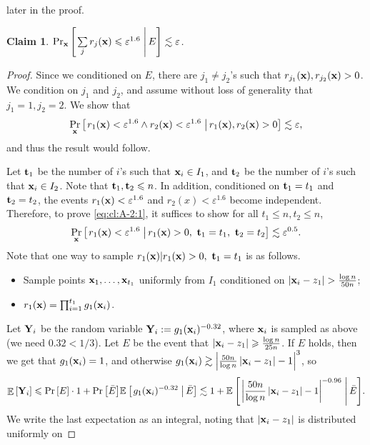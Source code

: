 \documentclass[10pt,a4paper]{article}
\newtheorem{claim}[thm]{Claim}
\newcommand\card[1]{\left| {#1} \right|}
\newcommand\Prob[2]{{\Pr_{#1}\left[ {#2} \right]}}
\newcommand\cProb[3]{{\Pr_{#1}\left[ \left. #3 \;\right\vert #2 \right]}}
\newcommand\Expect[2]{{\mathop{\mathbb{E}}_{#1}\left[ {#2} \right]}}
\newcommand\cExpect[3]{{\mathbb{E}_{#1}\left[ \left. #3 \;\right\vert #2 \right]}}
\newcommand\eps{\varepsilon}
\renewcommand\geq{\geqslant}
\renewcommand\leq{\leqslant}
\newcommand{\ve}{\varepsilon}
\def\gg{\gtrsim}
\def\ll{\lesssim}
\begin{document}
later in the proof.
\begin{claim}\label{cl:A-2}
  $\cProb{{\bf x}}{E}{\sum\limits_{j} r_j({\bf x}) \leq \eps^{1.6}} \ll \eps$.
\end{claim}
\begin{proof}
Since we conditioned on $E$, there are $j_1\neq j_2$'s such that
$r_{j_1}({\bf x}),r_{j_2}({\bf x}) > 0$. We condition on $j_1$ and $j_2$, and assume without loss of generality that
$j_1 = 1,j_2=2$. We show that
\begin{equation}\label{eq:cl:A-2:1}
\cProb{{\bf x}}{r_1({\bf x}),r_2({\bf x})>0}{r_{1}({\bf x})<\ve^{1.6} \wedge r_{2}({\bf x})<\ve^{1.6}} \ll \eps,
\end{equation}
and thus the result would follow.

Let ${\bf t}_1$ be the number of $i$'s such that ${\bf x}_i\in I_{1}$, and ${\bf t}_2$ be the number of $i$'s such that ${\bf x}_i\in I_{2}$.
Note that ${\bf t}_1, {\bf t}_2 \leq n$.
In addition, conditioned on ${\bf t}_1=t_1$ and ${\bf t}_2=t_2$, the events $r_1({\bf x})<\ve^{1.6}$ and $r_2(x)<\ve^{1.6}$ become independent.
Therefore, to prove \eqref{eq:cl:A-2:1}, it suffices to show for all $t_1\leq n, t_2\leq n$,
  	\begin{equation}
  \cProb{{\bf x}}{r_1({\bf x})>0,~{\bf t}_1=t_1,~{\bf t}_2=t_2}{r_1({\bf x})<\ve^{1.6}}\ll \eps^{0.5}.
  \label{eq:cl:A-2:2}
  \end{equation}
  Note that one way to sample $r_1({\bf x})| r_1({\bf x})>0,~{\bf t}_1=t_1$ is as follows.
  \begin{itemize}
  	\item Sample points ${\bf x}_1,\ldots,{\bf x}_{t_1}$ uniformly from $I_1$ conditioned on $|{\bf x}_i-z_1| > \frac{\log n}{50 n}$;
  	\item
  	$r_1({\bf x}) = \prod_{i=1}^{t_1} g_1({\bf x}_i)$.
  	\end{itemize}
  Let ${\bf Y}_i$ be the random variable ${\bf Y}_i := g_1({\bf x}_i)^{-0.32}$, where
  ${\bf x}_i$ is sampled as above (we need $0.32<1/3$).
  Let $E$ be the event that $\card{{\bf x}_i - z_1}\geq \frac{\log n}{25 n}$.
  If $E$ holds, then we get that $g_1({\bf x}_i) = 1$, and
  otherwise $g_1({\bf x}_i)\gg \card{\frac{50n}{\log n}\card{{\bf x}_i - z_1} - 1}^3$,
  so
  \[
  \Expect{}{{\bf Y}_i}
  \leq \Prob{}{E}\cdot 1 + \Prob{}{\bar{E}}\cExpect{}{\bar{E}}{g_1({\bf x}_i)^{-0.32}}
  \ll 1 + \cExpect{}{\bar{E}}{\card{\frac{50n}{\log n}\card{{\bf x}_i - z_1} - 1}^{-0.96}}.
  \]
  We write the last expectation as an integral, noting that $\card{{\bf x}_i-z_1}$ is distributed uniformly on

\end{proof}
\end{document}
